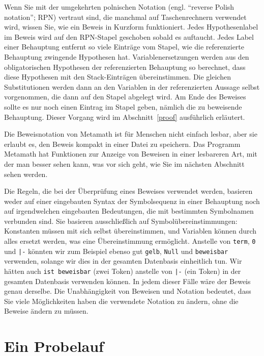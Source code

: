 Wenn Sie mit der umgekehrten polnischen Notation (engl. "`reverse Polish notation"'; RPN) vertraut sind, die manchmal auf Taschenrechnern verwendet wird, wissen Sie, wie ein Beweis in Kurzform funktioniert.  Jedes Hypothesenlabel im Beweis wird auf den RPN-Stapel geschoben sobald es auftaucht. Jedes Label einer Behauptung entfernt so viele
Einträge vom Stapel, wie die referenzierte Behauptung zwingende Hypothesen hat.  Variablenersetzungen werden
aus den obligatorischen Hypothesen der referenzierten Behauptung so berechnet, dass diese Hypothesen mit den Stack-Einträgen übereinstimmen. Die gleichen Substitutionen
werden dann an den Variablen in der referenzierten Aussage selbst vorgenommen, die dann auf den Stapel abgelegt wird.  Am Ende des Beweises sollte es nur noch einen Eintrag im Stapel geben, nämlich die zu beweisende Behauptung.  Dieser Vorgang wird im Abschnitt~\ref{proof} ausführlich erläutert.

Die Beweisnotation von Metamath ist für Menschen nicht einfach lesbar, aber sie erlaubt es, den Beweis kompakt in einer Datei zu speichern.  Das Programm Metamath hat Funktionen zur Anzeige von Beweisen in einer lesbareren Art, mit der man besser sehen kann, was vor sich geht, wie Sie im nächsten Abschnitt sehen werden.

Die Regeln, die bei der Überprüfung eines Beweises verwendet werden, basieren weder auf einer eingebauten Syntax der Symbolsequenz in einer Behauptung noch auf irgendwelchen eingebauten Bedeutungen, die mit bestimmten Symbolnamen verbunden sind.  Sie basieren ausschließlich auf Symbolübereinstimmungen: Konstanten müssen mit sich selbst übereinstimmen, und Variablen können durch alles ersetzt werden, was eine Übereinstimmung ermöglicht.  Anstelle von \texttt{term}, \texttt{0} und \verb$|-$ könnten wir zum Beispiel ebenso gut \texttt{gelb}, \texttt{Null} und \texttt{beweisbar} verwenden, solange wir dies in der gesamten Datenbasis einheitlich tun.  Wir hätten auch \texttt{ist beweisbar} (zwei Token) anstelle von \verb$|-$ (ein Token) in der gesamten Datenbasis verwenden können.  In jedem dieser Fälle wäre der Beweis genau derselbe.  Die Unabhängigkeit von Beweisen und Notation bedeutet, dass Sie viele Möglichkeiten haben die verwendete Notation zu ändern, ohne die Beweise ändern zu müssen.

\section{Ein Probelauf}\label{trialrun}

